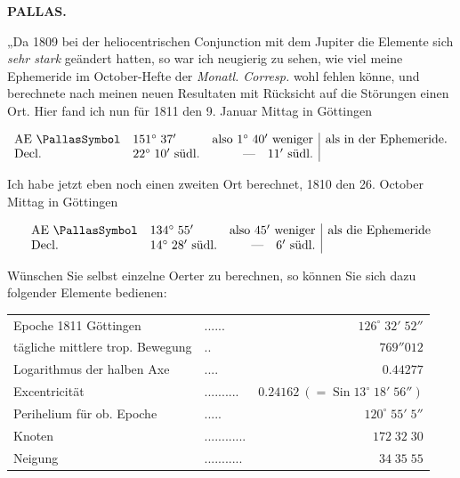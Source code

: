 \clearpage
\thispagestyle{empty}
\noindent{}%
\makebox[12mm][l]{}%
\parbox[t]{\dimexpr\linewidth-24mm\relax}{\centering\footnotesize\bfseries PALLAS.\par}%
\par\nobreak\medskip
\par\indent „Da 1809 bei der heliocentrischen Conjunction mit dem Jupiter die Elemente sich \emph{sehr stark} geändert hatten, so war ich neugierig zu sehen, wie viel meine Ephemeride im October-Hefte der \emph{Monatl. Corresp.} wohl fehlen könne, und berechnete nach meinen neuen Resultaten mit Rücksicht auf die Störungen einen Ort. Hier fand ich nun für 1811 den 9. Januar Mittag in Göttingen

{\fontsize{10}{12}\selectfont\[\begin{array}{llr|l}\text{AE }\PallasSymbol & 151^\circ\;37' & \text{also }1^\circ\;40'\text{ weniger} & \raisebox{-0.6\baselineskip}{als in der Ephemeride.}\\\text{Decl.} & 22^\circ\;10'\text{ südl.} & \text{—}\quad 11'\text{ südl.} & \end{array}\]}

\noindent Ich habe jetzt eben noch einen zweiten Ort berechnet, 1810 den 26. October Mittag in Göttingen

{\fontsize{10}{12}\selectfont\[\begin{array}{llr|l}\text{AE }\PallasSymbol & 134^\circ\;55' & \text{also }45'\text{ weniger} & \raisebox{-0.6\baselineskip}{als die Ephemeride}\\\text{Decl.} & 14^\circ\;28'\text{ südl.} & \text{—}\quad 6'\text{ südl.} & \end{array}\]}

\noindent Wünschen Sie selbst einzelne Oerter zu berechnen, so können Sie sich dazu folgender Elemente bedienen:

\begin{center}\fontsize{10}{12}\selectfont\setlength{\tabcolsep}{4pt}\renewcommand{\arraystretch}{1.15}\begin{tabular}{llr}
Epoche 1811 Göttingen & .\;.\;.\;.\;.\;. & $126^\circ\;32'\;52''$\\
tägliche mittlere trop. Bewegung & .\;. & $769''012$\\
Logarithmus der halben Axe & .\;.\;.\;. & $0.44277$\\
Excentricität & .\;.\;.\;.\;.\;.\;.\;.\;.\;. & $0.24162\ (=\operatorname{Sin}13^\circ\;18'\;56'')$\\
Perihelium für ob. Epoche & .\;.\;.\;.\;. & $120^\circ\;55'\;5''$\\
Knoten & .\;.\;.\;.\;.\;.\;.\;.\;.\;.\;.\;. & $172\;32\;30$\\
Neigung & .\;.\;.\;.\;.\;.\;.\;.\;.\;.\;. & $34\;35\;55$\\
\end{tabular}\end{center}

